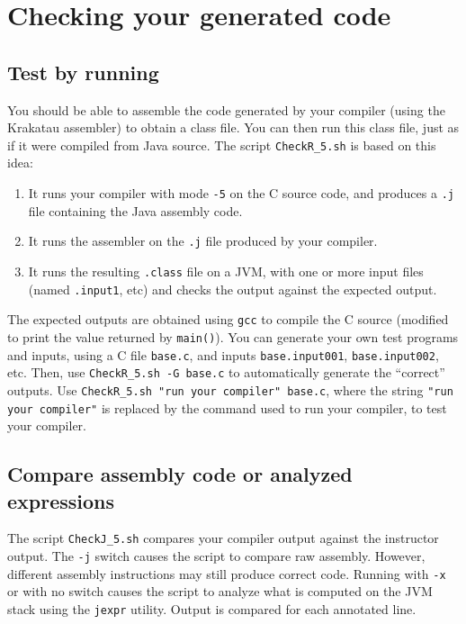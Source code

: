 \documentclass{article}
\newcommand{\codegen}{5}
\begin{document}
\section{Checking your generated code} \label{SEC:checking}

\subsection{Test by running}

You should be able to assemble the code generated by your compiler
(using the Krakatau assembler)
to obtain a class file.
You can then run this class file,
just as if it were compiled from Java source.
The script {\tt CheckR\_5.sh} is based on this idea:
\begin{enumerate}
  \item
  It runs your compiler with mode {\tt -\codegen} on the C source code,
    and produces a {\tt .j} file containing the Java assembly code.

  \item
  It runs the assembler on the {\tt .j} file produced by your compiler.

  \item
  It  runs the resulting {\tt .class} file on a JVM,
    with one or more input files (named {\tt .input1}, etc)
  and checks the output against the expected output.
\end{enumerate}
The expected outputs are obtained using {\tt gcc} to compile
the C source
(modified to print the value returned by {\tt main()}).
You can generate your own test programs and inputs,
using a C file {\tt base.c},
and
inputs {\tt base.input001}, {\tt base.input002}, etc.
Then, use {\tt CheckR\_5.sh -G base.c}
to automatically generate the ``correct'' outputs.
Use {\tt CheckR\_5.sh "run your compiler" base.c},
where the string {\tt "run your compiler"}
is replaced by the command used to run your compiler,
to test your compiler.

\subsection{Compare assembly code or analyzed expressions}

The script {\tt CheckJ\_5.sh} compares your compiler output against
the instructor output.
The {\tt -j} switch causes the script to compare raw assembly.
However, different assembly instructions may still produce correct code.
Running with {\tt -x} or with no switch causes the script to analyze
what is computed on the JVM stack using the {\tt jexpr} utility.
Output is compared for each annotated line.
\end{document}
